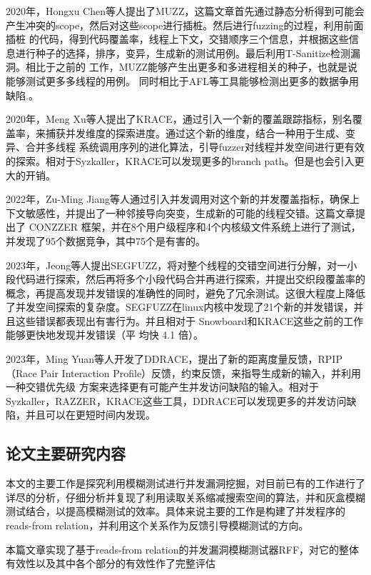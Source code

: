 2020年，Hongxu Chen\cite{chen2020muzz}等人提出了MUZZ，这篇文章首先通过静态分析得到可能会产生冲突的scope，然后对这些scope进行插桩。然后进行fuzzing的过程，利用前面插桩 的代码，得到代码覆盖率，线程上下文，交错顺序三个信息，并根据这些信息进行种子的选择，排序，变异，生成新的测试用例。最后利用T-Sanitize检测漏洞。相比于之前的 工作，MUZZ能够产生出更多和多进程相关的种子，也就是说能够测试更多多线程的用例。 同时相比于AFL等工具能够检测出更多的数据争用缺陷.。

2020年，Meng Xu\cite{xu2020krace}等人提出了KRACE，通过引入一个新的覆盖跟踪指标，别名覆盖率，来捕获并发维度的探索进度。通过这个新的维度，结合一种用于生成、变异、合并多线程 系统调用序列的进化算法，引导fuzzer对线程并发空间进行更有效的探索。相对于Syzkaller，KRACE可以发现更多的branch path。但是也会引入更大的开销。 

2022年，Zu-Ming Jiang\cite{jiang2022context}等人通过引入并发调用对这个新的并发覆盖指标，确保上 下文敏感性，并提出了一种邻接导向突变，生成新的可能的线程交错。这篇文章提出了 CONZZER 框架，并在8个用户级程序和4个内核级文件系统上进行了测试，并发现了95个数据竞争，其中75个是有害的。 

2023年，Jeong等人提出SEGFUZZ\cite{jeong2023segfuzz}，将对整个线程的交错空间进行分解，对一小段代码进行探索，然后再将多个小段代码合并再进行探索，并提出交织段覆盖率的概念，再提高发现并发错误的准确性的同时，避免了冗余测试。这很大程度上降低了并发空间探索的复杂度。SEGFUZZ在linux内核中发现了21个新的并发错误，并且这些错误都表现出有害行为。并且相对于 Snowboard和KRACE这些之前的工作能够更快地发现并发错误（平 均快 4.1 倍）。 

2023年，Ming Yuan等人开发了DDRACE\cite{yuan2023ddrace}，提出了新的距离度量反馈，RPIP（Race Pair Interaction Profile）反馈，约束反馈，来指导生成新的输入，并利用一种交错优先级 方案来选择更有可能产生并发访问缺陷的输入。相对于Syzkaller，RAZZER，KRACE这些工具，DDRACE可以发现更多的并发访问缺陷，并且可以在更短时间内发现。


\subsection{论文主要研究内容}

本文的主要工作是探究利用模糊测试进行并发漏洞挖掘，对目前已有的工作进行了详尽的分析，仔细分析并复现了利用读取关系缩减搜索空间的算法，并和灰盒模糊测试结合，以提高模糊测试的效率。具体来说主要的工作是构建了并发程序的reads-from relation，并利用这个关系作为反馈引导模糊测试的方向。

本篇文章实现了基于reads-from relation的并发漏洞模糊测试器RFF，对它的整体有效性以及其中各个部分的有效性作了完整评估


